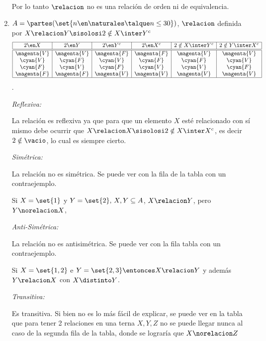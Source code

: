 \begin{enumerate}[label=\roman*)]
        Por lo tanto $\relacion$ no es una relación de orden ni de equivalencia.

  \item $
          A =
          \partes(\set{n \en \naturales \talque n \leq 30})$, $\relacion$ definida por $X \relacion Y \sisolosi 2 \notin X \inter Y^c
        $
        $$
          \begin{array}{|c|c|c|c|c|c|}
            \hline
            2 \en X     & 2 \en Y     & 2 \en Y^c   & 2 \en X^c   & 2 \notin X \inter Y^c & 2 \notin Y \inter X^c \\ \hline  \hline
            \magenta{V} & \magenta{V} & \magenta{F} & \magenta{F} & \magenta{V}           & \magenta{V}           \\
            \cyan{V}    & \cyan{F}    & \cyan{V}    & \cyan{F}    & \cyan{F}              & \cyan{V}              \\
            \cyan{F}    & \cyan{V}    & \cyan{F}    & \cyan{V}    & \cyan{V}              & \cyan{F}              \\
            \magenta{F} & \magenta{F} & \magenta{V} & \magenta{V} & \magenta{V}           & \magenta{V}           \\ \hline
          \end{array}$$.

        \textit{Reflexiva:}

        La relación es reflexiva ya que para que un elemento $X$ esté relacionado con sí mismo debe ocurrir
        que $X \relacion X \sisolosi 2 \notin X \inter X^c$, es decir $2 \notin \vacio$, lo cual es siempre cierto.

        \textit{Simétrica:}

        La relación no es simétrica. Se puede ver con la  fila de la tabla con un contraejemplo.

        Si $X = \set{1}$ y $Y = \set{2},\, X,Y \subseteq A$, $X \relacion Y$, pero $Y \norelacion X$,

        \textit{Anti-Simétrica:}

        La relación no es antisimétrica. Se puede ver con la  fila tabla
        con un contraejemplo.

        Si $X = \set{1,2}$ e $Y = \set{2,3} \entonces X \relacion Y$ y además $Y \relacion X$
        con  $X \distinto Y$.

        \textit{Transitiva:}

        Es transitiva. Si bien no es lo más fácil de explicar, se puede ver en la tabla que para tener 2 relaciones
        en una terna $X, Y, Z$ no se puede llegar nunca al caso de la segunda fila de la tabla, donde se lograría que
        $X \norelacion Z$


\end{enumerate}
